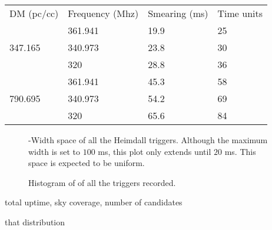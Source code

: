 \begin{table}
	\label{tab:dmsmearing}
	\caption{In-channel smearing at \dm~s where tscrunching is activated for the lowest and highest frequency channels. The sampling time is $781.25\ \mu$s and frequency channel width is $655.255$kHz.}
	\begin{table}[]
		\begin{tabular}{llll}
			DM (pc/cc)               & Frequency (Mhz) & Smearing (ms) & Time units \\
			\multirow{3}{*}{347.165} & 361.941         & 19.9          & 25         \\
															 & 340.973         & 23.8          & 30         \\
															 & 320             & 28.8          & 36         \\
			\multirow{3}{*}{790.695} & 361.941         & 45.3          & 58         \\
															 & 340.973         & 54.2          & 69         \\
															 & 320             & 65.6          & 84        
		\end{tabular}
		\end{table}
\end{table}

\begin{figure}
	\label{fig:triheimdall}
	\caption{\dm-Width space of all the Heimdall triggers. Although the maximum width is set to $100$ ms, this plot only extends until $20$ ms.
		This space is expected to be uniform.
	}
\end{figure}

\begin{figure}
	\label{fig:histdm}
	\caption{Histogram of \dm of all the triggers recorded.}
\end{figure}

\par total uptime, sky coverage, number of candidates
\par that distribution


